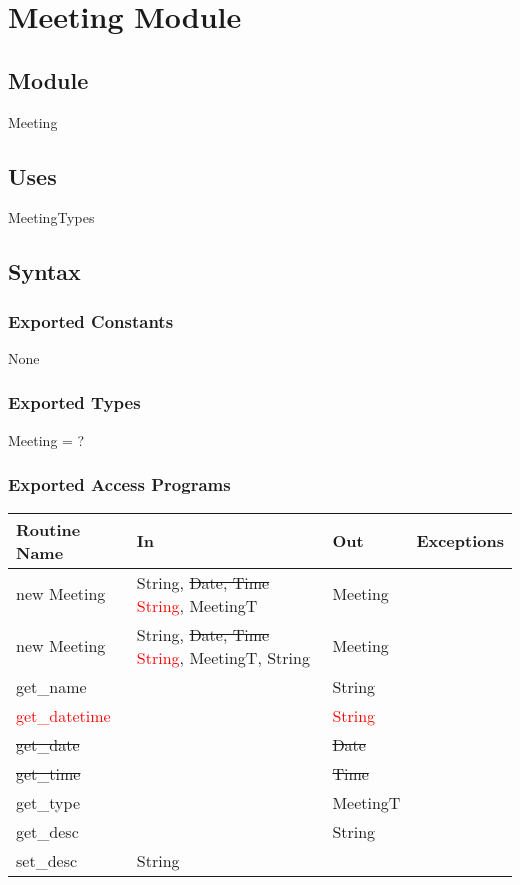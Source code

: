 \documentclass[12pt, titlepage]{article}
\begin{document}
\newpage

\section* {Meeting Module}

\subsection*{Module}
Meeting

\subsection* {Uses}
MeetingTypes

\subsection* {Syntax}
\subsubsection* {Exported Constants}
None

\subsubsection* {Exported Types}
Meeting = ?

\subsubsection* {Exported Access Programs}
\begin{tabular}{|l|l|l|l|}
    \hline
    \textbf{Routine Name} & \textbf{In} & \textbf{Out} & \textbf{Exceptions} \\
    \hline
    new Meeting & String, \sout{Date, Time} \textcolor{red}{String}, MeetingT & Meeting & \\
    \hline
    new Meeting & String, \sout{Date, Time} \textcolor{red}{String}, MeetingT, String & Meeting & \\
    \hline
    get\_name & & String &\\
    \hline
    \textcolor{red}{get\_datetime} & & \textcolor{red}{String} &\\
    \hline
    {\sout{get\_date}} & & {\sout{Date}}&\\
    \hline
    {\sout{get\_time}} & & {\sout{Time}}&\\
    \hline
    get\_type & & MeetingT &\\
    \hline
    get\_desc & & String &\\
    \hline
    set\_desc & String & & \\
    \hline
\end{tabular}
\end{document}
